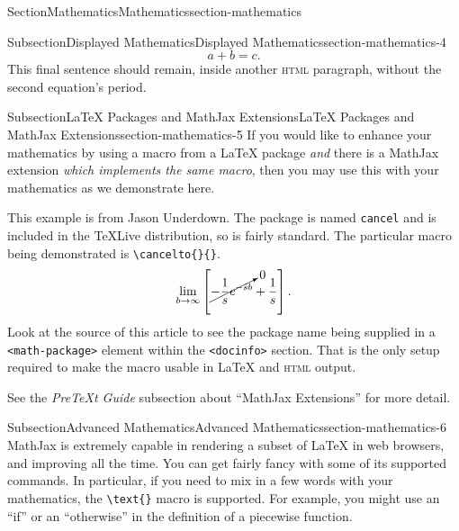 \documentclass[twoside,10pt,]{article}
\newcommand{\mono}[1]{\texttt{#1}}
\newcommand{\initialism}[1]{\textsc{\MakeLowercase{#1}}}
\newcommand{\pubtitle}[1]{\textsl{#1}}
\numberwithin{equation}{section}
\begin{document}
\begin{sectionptx}{Section}{Mathematics}{}{Mathematics}{}{}{section-mathematics}
\begin{subsectionptx}{Subsection}{Displayed Mathematics}{}{Displayed Mathematics}{}{}{section-mathematics-4}
\begin{equation*}
a + b = c\text{.}
\end{equation*}
This final sentence should remain, inside another \initialism{HTML} paragraph, without the second equation's period.%
\end{subsectionptx}
%
%
\typeout{************************************************}
\typeout{************************************************}
%
\begin{subsectionptx}{Subsection}{\LaTeX{} Packages and MathJax Extensions}{}{\LaTeX{} Packages and MathJax Extensions}{}{}{section-mathematics-5}
If you would like to enhance your mathematics by using a macro from a \LaTeX{} package \emph{and} there is a MathJax extension \emph{which implements the same macro}, then you may use this with your mathematics as we demonstrate here.%
\par
This example is from Jason Underdown.  The package is named \mono{cancel} and is included in the TeXLive distribution, so is fairly standard.  The particular macro being demonstrated is \mono{\textbackslash{}cancelto\{\}\{\}}.%
\begin{equation*}
\lim_{b \rightarrow \infty}\left[\cancelto{0}{-\frac{1}{s}e^{-sb}} + \frac{1}{s}\right]\text{.}
\end{equation*}
Look at the source of this article to see the package name being supplied in a \mono{<math-package>} element within the \mono{<docinfo>} section.  That is the only setup required to make the macro usable in \LaTeX{} and \initialism{HTML} output.\index{cancelto macro@\mono{cancelto} macro}%
\par
See the \pubtitle{PreTeXt Guide} subsection about ``MathJax Extensions'' for more detail.%
\end{subsectionptx}
%
%
\typeout{************************************************}
\typeout{************************************************}
%
\begin{subsectionptx}{Subsection}{Advanced Mathematics}{}{Advanced Mathematics}{}{}{section-mathematics-6}
MathJax is extremely capable in rendering a subset of \LaTeX{} in web browsers, and improving all the time.  You can get fairly fancy with some of its supported commands.  In particular, if you need to mix in a few words with your mathematics, the \mono{\textbackslash{}text\{\}} macro is supported.  For example, you might use an ``if'' or an ``otherwise'' in the definition of a piecewise function.%

\end{subsectionptx}
\end{sectionptx}
\end{document}

